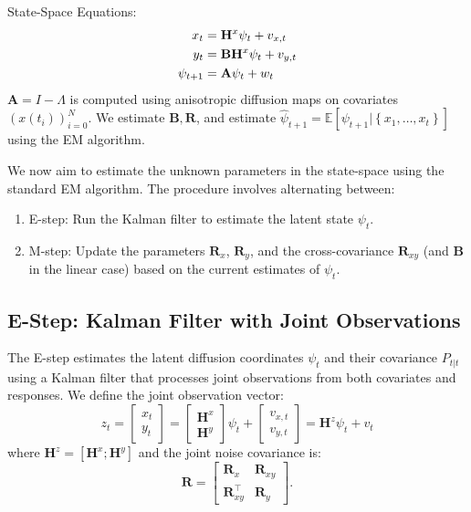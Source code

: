 \documentclass[11pt]{article}
\theoremstyle{plain}
\theoremstyle{definition}
\theoremstyle{remark}
\numberwithin{equation}{section}
\begin{document}
 \begin{tcolorbox}[colback=blue!5!white,colframe=blue!75!black,title=Special Case: Linear Multi-Factor Model]
 State-Space Equations:
\begin{equation*}
\begin{aligned}
x_t&={\bf H}^x \psi_t + v_{x,t}\\
y_t &= {\mathbf B} {\mathbf H}^x \psi_t + v_{y,t}\\
\psi_{t+1} &= \mathbf{A} \psi_t + w_t
\end{aligned}
\end{equation*}
$\mathbf{A}=I-\Lambda$ is computed using anisotropic diffusion maps on covariates $(x(t_i))_{i=0}^N$. We estimate $\mathbf{B}, \mathbf{R}$, and estimate $\hat{\psi}_{t+1} = \mathbb{E} [\psi_{t+1} | \left\{x_1,\ldots,x_{t} \right\}]$ using the EM algorithm. 
\end{tcolorbox}
 
We now aim to estimate the unknown parameters in the state-space using the standard EM algorithm. The procedure involves alternating between:
\begin{enumerate}
    \item E-step: Run the Kalman filter to estimate the latent state $\psi_t$.
    \item M-step: Update the parameters $\mathbf{R}_x$, $\mathbf{R}_y$, and the cross-covariance $\mathbf{R}_{xy}$ (and $\mathbf{B}$ in the linear case) based on the current estimates of $\psi_t$. 
\end{enumerate}

\subsection{E-Step: Kalman Filter with Joint Observations}

The E-step estimates the latent diffusion coordinates $\psi_t$ and their covariance $P_{t|t}$ using a Kalman filter that processes joint observations from both covariates and responses. We define the joint observation vector:
\[z_t = \begin{bmatrix} x_t \\ y_t \end{bmatrix} = \begin{bmatrix} \mathbf{H}^x \\ \mathbf{H}^y \end{bmatrix} \psi_t + \begin{bmatrix} v_{x,t} \\ v_{y,t} \end{bmatrix} = \mathbf{H}^z \psi_t + v_t\]
where $\mathbf{H}^z = [\mathbf{H}^x; \mathbf{H}^y]$ and the joint noise covariance is:
\[\mathbf{R} = \begin{bmatrix} \mathbf{R}_x & \mathbf{R}_{xy} \\ \mathbf{R}^\top_{xy} & \mathbf{R}_y \end{bmatrix}.\]
\end{document}
